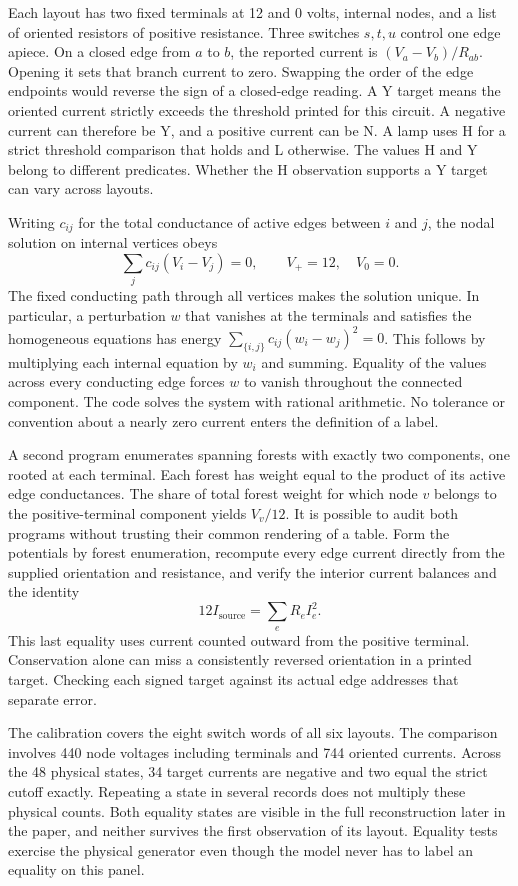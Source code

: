 \documentclass[12pt,letterpaper]{article}
\begin{document}
Each layout has two fixed terminals at 12 and 0 volts, internal nodes, and a list of oriented resistors of positive resistance. Three switches $s,t,u$ control one edge apiece. On a closed edge from $a$ to $b$, the reported current is $(V_a-V_b)/R_{ab}$. Opening it sets that branch current to zero. Swapping the order of the edge endpoints would reverse the sign of a closed-edge reading. A Y target means the oriented current strictly exceeds the threshold printed for this circuit. A negative current can therefore be Y, and a positive current can be N. A lamp uses H for a strict threshold comparison that holds and L otherwise. The values H and Y belong to different predicates. Whether the H observation supports a Y target can vary across layouts.

Writing $c_{ij}$ for the total conductance of active edges between $i$ and $j$, the nodal solution on internal vertices obeys
\[
 \sum_j c_{ij}(V_i-V_j)=0,\qquad V_+=12,\quad V_0=0.
\]
The fixed conducting path through all vertices makes the solution unique. In particular, a perturbation $w$ that vanishes at the terminals and satisfies the homogeneous equations has energy $\sum_{\{i,j\}}c_{ij}(w_i-w_j)^2=0$. This follows by multiplying each internal equation by $w_i$ and summing. Equality of the values across every conducting edge forces $w$ to vanish throughout the connected component. The code solves the system with rational arithmetic. No tolerance or convention about a nearly zero current enters the definition of a label.

A second program enumerates spanning forests with exactly two components, one rooted at each terminal. Each forest has weight equal to the product of its active edge conductances. The share of total forest weight for which node $v$ belongs to the positive-terminal component yields $V_v/12$. It is possible to audit both programs without trusting their common rendering of a table. Form the potentials by forest enumeration, recompute every edge current directly from the supplied orientation and resistance, and verify the interior current balances and the identity
\[
  12 I_{\mathrm{source}}=\sum_e R_e I_e^2 .
\]
This last equality uses current counted outward from the positive terminal. Conservation alone can miss a consistently reversed orientation in a printed target. Checking each signed target against its actual edge addresses that separate error.

The calibration covers the eight switch words of all six layouts. The comparison involves 440 node voltages including terminals and 744 oriented currents. Across the 48 physical states, 34 target currents are negative and two equal the strict cutoff exactly. Repeating a state in several records does not multiply these physical counts. Both equality states are visible in the full reconstruction later in the paper, and neither survives the first observation of its layout. Equality tests exercise the physical generator even though the model never has to label an equality on this panel.
\end{document}
